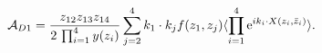 \begin{equation}
 {\cal A}_{D1}  =  {z_{12}z_{13}z_{14} \over 2\,
 \prod_{i=1}^4 y(z_i)}
  \sum_{ j=2}^4 k_1 \cdot k_j
 f(z_1,z_j)   \langle \prod_{i=1}^4
\hbox{e}^{i k_i \cdot X(z_i, \bar z_i)} \rangle  . \label{eqd1}
\end{equation}

